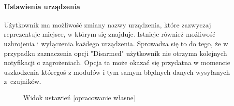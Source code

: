 \paragraph{Ustawienia urządzenia}
Użytkownik ma możliwość zmiany nazwy urządzenia, które zazwyczaj reprezentuje miejsce, w którym się znajduje. Istnieje również możliwość uzbrojenia i wyłączenia każdego urządzenia. Sprowadza się to do tego, że w przypadku zaznaczenia opcji "Disarmed"  użytkownik nie otrzyma kolejnych notyfikacji o zagrożeniach. Opcja ta może okazać się przydatna w momencie uszkodzenia któregoś z modułów i tym samym błędnych danych wysyłanych z~czujników.
\nopagebreak
\begin{figure}[H]
    \centering
    \hfill
    \hfill
    \caption{Widok ustawień [opracowanie własne] }
    \label{fig:ustawienia}
\end{figure}

